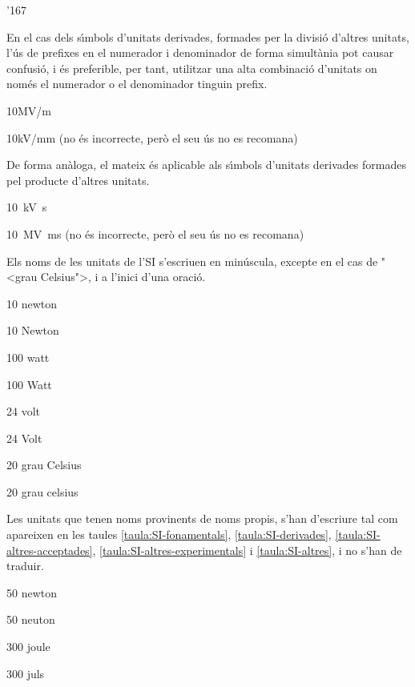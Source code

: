 \begin{dinglist}{'167}
\item En el cas dels s\'{\i}mbols d'unitats derivades, formades per la divisi\'{o}
d'altres unitats, l'\'{u}s de prefixes en el numerador i denominador de
forma simult\`{a}nia pot causar confusi\'{o}, i \'{e}s preferible, per tant,
utilitzar una alta combinaci\'{o} d'unitats on nom\'{e}s el numerador o el
denominador tinguin prefix.

\textcolor{Green}{} 10\unit{MV/m}

\textcolor{Red}{}  10\unit{kV/mm}  (no \'{e}s incorrecte, per\`{o} el seu \'{u}s no es recomana)


\item De forma an\`{a}loga, el mateix \'{e}s aplicable als s\'{\i}mbols d'unitats
derivades formades pel producte d'altres unitats.

\textcolor{Green}{} \SI{10}{kV.s}

\textcolor{Red}{}  \SI{10}{MV.ms}  (no \'{e}s incorrecte, per\`{o} el seu \'{u}s no es recomana)


\item Els noms de les unitats de l'SI s'escriuen en min\'{u}scula, excepte en
el cas de {"<}grau Celsius{">}, i a l'inici d'una oraci\'{o}.

\textcolor{Green}{} 10 newton

\textcolor{Red}{} 10 Newton

\textcolor{Green}{}  100 watt

\textcolor{Red}{} 100 Watt

\textcolor{Green}{}  24 volt

\textcolor{Red}{} 24 Volt

\textcolor{Green}{}  20 grau Celsius

\textcolor{Red}{} 20 grau celsius


\item Les unitats que tenen noms provinents de noms propis, s'han
d'escriure tal com apareixen en les taules
\vref{taula:SI-fonamentals}, \vref{taula:SI-derivades}, \vref{taula:SI-altres-acceptades}, \vref{taula:SI-altres-experimentals} i \vref{taula:SI-altres}, i no s'han
de traduir.

\textcolor{Green}{} 50 newton

\textcolor{Red}{}  50 neuton

\textcolor{Green}{} 300 joule

\textcolor{Red}{}  300 juls


\end{dinglist}
